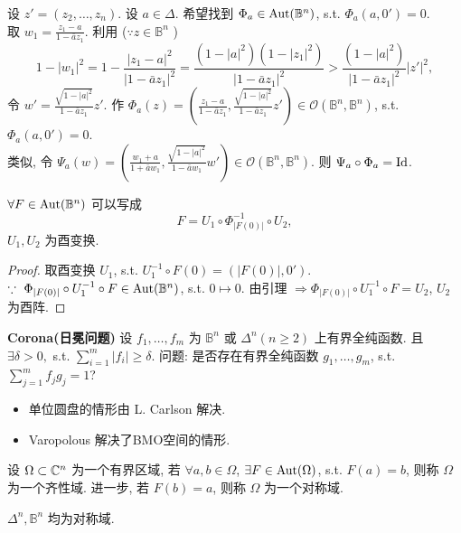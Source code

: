 设 $z'=(z_2,\dots,z_n)$. 
设 $a \in \Delta $. 希望找到 $\Phi _a \in \operatorname{Aut} (\mathbb{B}^n)$, s.t. $\Phi _a(a,0')=0.$   \\
取 $w_1 = \frac{z_1-a}{1-\bar a z_1}$. 利用 ($\because z \in \mathbb{B}^n $  )
$$ 1-|w_1|^2=1-\frac{|z_1-a|^2}{|1-\bar a z_1|^2} =\frac{(1-|a|^2)(1-|z_1|^2)}{|1-\bar a z_1|^2} > \frac{(1-|a|^2)}{|1-\bar a z_1|^2}|z'|^2,  $$
令 $w'=\frac{\sqrt{1-|a|^2}}{1-\bar a z_1} z'$. 
作 $\Phi _a(z)= \left( \frac{z_1-a}{1-\bar a z_1},\frac{\sqrt{1-|a|^2}}{1-\bar a z_1} z' \right) \in \mathcal{O}(\mathbb{B}^n, \mathbb{B}^n)$, s.t. $ \Phi _a(a,0')=0$.\\
类似, 令 $\Psi _a(w)=\left( \frac{w_1+a}{1+\bar a w_1},\frac{\sqrt{1-|a|^2}}{1-\bar a w_1} w'\right) \in  \mathcal{O}(\mathbb{B}^n, \mathbb{B}^n)$. 则 $\Psi_a \circ \Phi _a =\operatorname{Id}$.     

\begin{theorem}
  $\forall F \in \operatorname{Aut}(\mathbb{B}^n)$ 可以写成 
  $$ F=U_1 \circ \Phi _{|F(0)|}^{-1} \circ U_2 ,$$ 
  $U_1,U_2$ 为酉变换.  
\end{theorem}
\begin{proof}
  取酉变换 $U_1$, s.t. $U_1^{-1} \circ F(0)=(|F(0)|,0')$.  \\
  $\because~ \Phi _{|F(0)|}\circ U_{1}^{-1} \circ F \in \operatorname{Aut} (\mathbb{B}^n)  $, s.t. $0 \mapsto 0$. 
  由引理 $\Rightarrow \Phi _{|F(0)|}\circ U_{1}^{-1} \circ F=U_2$, $U_2$ 为酉阵.     
\end{proof}

\noindent\textbf{Corona(日冕问题)} 设 $f_1,\dots,f_m$ 为 $\mathbb{B}^n$ 或 $\Delta ^n (n \geq 2)$   上有界全纯函数. 且 $\exists \delta >0,$ s.t. $\sum_{i=1}^{m}|f_i| \geq \delta $. 问题: 是否存在有界全纯函数 $g_1,\dots,g_m$, s.t. $\sum_{j=1}^{m}f_jg_j=1$?    

\begin{itemize}
\item 单位圆盘的情形由 L. Carlson 解决.
\item Varopolous 解决了BMO空间的情形.
\end{itemize}

\begin{definition}
  设 $\Omega  \subset {\mathbb C}^n$ 为一个有界区域, 若 $\forall a,b \in \Omega $, $\exists F \in \operatorname{Aut}(\Omega )$, s.t. $F(a)=b$, 则称 $\Omega $ 为一个齐性域. 进一步, 若 $F(b)=a$, 则称 $\Omega $ 为一个对称域.       
\end{definition}

\begin{example}
  $\Delta ^n, \mathbb{B}^n$ 均为对称域. 
\end{example}

